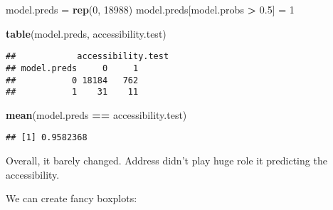 \documentclass[
]{article}
\newenvironment{Shaded}{\begin{snugshade}}{\end{snugshade}}
\newcommand{\DecValTok}[1]{\textcolor[rgb]{0.00,0.00,0.81}{#1}}
\newcommand{\FloatTok}[1]{\textcolor[rgb]{0.00,0.00,0.81}{#1}}
\newcommand{\FunctionTok}[1]{\textcolor[rgb]{0.13,0.29,0.53}{\textbf{#1}}}
\newcommand{\NormalTok}[1]{#1}
\newcommand{\OtherTok}[1]{\textcolor[rgb]{0.56,0.35,0.01}{#1}}
\newcommand{\SpecialCharTok}[1]{\textcolor[rgb]{0.81,0.36,0.00}{\textbf{#1}}}
\begin{document}
\begin{Shaded}
\begin{Highlighting}[]
\NormalTok{model.preds }\OtherTok{=} \FunctionTok{rep}\NormalTok{(}\DecValTok{0}\NormalTok{, }\DecValTok{18988}\NormalTok{)}
\NormalTok{model.preds[model.probs }\SpecialCharTok{\textgreater{}} \FloatTok{0.5}\NormalTok{] }\OtherTok{=} \DecValTok{1}

\FunctionTok{table}\NormalTok{(model.preds, accessibility.test)}
\end{Highlighting}
\end{Shaded}

\begin{verbatim}
##            accessibility.test
## model.preds     0     1
##           0 18184   762
##           1    31    11
\end{verbatim}

\begin{Shaded}
\begin{Highlighting}[]
\FunctionTok{mean}\NormalTok{(model.preds }\SpecialCharTok{==}\NormalTok{ accessibility.test)}
\end{Highlighting}
\end{Shaded}

\begin{verbatim}
## [1] 0.9582368
\end{verbatim}

Overall, it barely changed. Address didn't play huge role it predicting
the accessibility.

We can create fancy boxplots:
\end{document}
